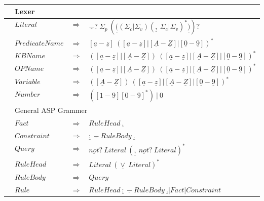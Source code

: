 \documentclass[a4paper,11pt]{article}
\theoremstyle{definition}
\begin{document}
				\begin{tabularx}{\textwidth}{p{0in}llX}
					\hline
					& \multicolumn{3}{l}{Lexer} \\
					\hline

					&	$Literal$													&	$\Rightarrow$	&	$\underline{-}? \ \Sigma_{p} \  (\underline{(}(\Sigma_{c}|\Sigma_{v}) (\underline{,} \  \Sigma_{c}|\Sigma_{v})^{*}\underline{)})?$ \\
					&	$\mathit{PredicateName}$									&	$\Rightarrow$	&	$[\underline{a}-\underline{z}] \  ([\underline{a}-\underline{z}] | [\underline{A}-\underline{Z}] | [\underline{0}-\underline{9}])^{*}$ \\
					&	$\mathit{KBName}$											&	$\Rightarrow$	&	$([\underline{a}-\underline{z}] | [\underline{A}-\underline{Z}]) \  ([\underline{a}-\underline{z}] | [\underline{A}-\underline{Z}] | [\underline{0}-\underline{9}])^{*}$ \\
					&	$\mathit{OPName}$											&	$\Rightarrow$	&	$([\underline{a}-\underline{z}] | [\underline{A}-\underline{Z}]) \  ([\underline{a}-\underline{z}] | [\underline{A}-\underline{Z}] | [\underline{0}-\underline{9}])^{*}$ \\
					&	$\mathit{Variable}$											&	$\Rightarrow$	&	$([\underline{A}-\underline{Z}]) \  ([\underline{a}-\underline{z}] | [\underline{A}-\underline{Z}] | [\underline{0}-\underline{9}])^{*}$ \\
					&	$\mathit{Number}$											&	$\Rightarrow$	&	$([\underline{1}-\underline{9}] [\underline{0}-\underline{9}]^{*}) \  | \  \underline{0}$ \\
					\hline
					& \multicolumn{3}{l}{General ASP Grammer} \\
					\hline

					&	$\mathit{Fact}$												&	$\Rightarrow$	&	$\mathit{RuleHead} \  \underline{.}$ \\
					&	$\mathit{Constraint}$										&	$\Rightarrow$	&	$\underline{:} \  \underline{-} \   \mathit{\mathit{RuleBody}} \  \underline{.}$ \\
					&	$\mathit{Query}$											&	$\Rightarrow$	&	$\underline{\mathit{not}}? \  \mathit{Literal} \   (\underline{,} \  \underline{\mathit{not}}? \  \mathit{Literal})^{*}$ \\
					&	$\mathit{RuleHead}$											&	$\Rightarrow$	&	$\mathit{Literal} \   (\underline{\vee} \   \mathit{Literal})^{*}$ \\
					&	$\mathit{RuleBody}$											&	$\Rightarrow$	&	$\mathit{Query}$ \\
					&	$\mathit{Rule}$												&	$\Rightarrow$	&	$\mathit{RuleHead} \  \underline{:} \  \underline{-} \   \mathit{RuleBody} \  \underline{.} | \mathit{Fact} | \mathit{Constraint}$ \\
					

\end{tabularx}
\end{document}
